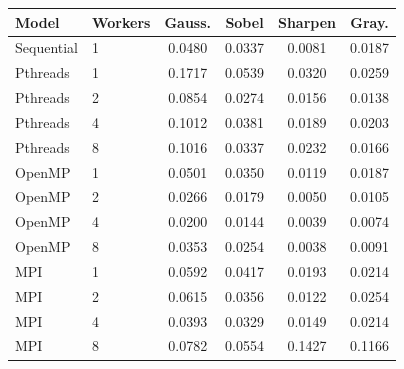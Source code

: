 \begin{tabular}{l l c c c c}
\toprule
Model & Workers & Gauss. & Sobel & Sharpen & Gray. \\
\midrule
Sequential & 1 & 0.0480 & 0.0337 & 0.0081 & 0.0187 \\
\midrule
Pthreads & 1 & 0.1717 & 0.0539 & 0.0320 & 0.0259 \\
Pthreads & 2 & 0.0854 & 0.0274 & 0.0156 & 0.0138 \\
Pthreads & 4 & 0.1012 & 0.0381 & 0.0189 & 0.0203 \\
Pthreads & 8 & 0.1016 & 0.0337 & 0.0232 & 0.0166 \\
\midrule
OpenMP & 1 & 0.0501 & 0.0350 & 0.0119 & 0.0187 \\
OpenMP & 2 & 0.0266 & 0.0179 & 0.0050 & 0.0105 \\
OpenMP & 4 & 0.0200 & 0.0144 & 0.0039 & 0.0074 \\
OpenMP & 8 & 0.0353 & 0.0254 & 0.0038 & 0.0091 \\
\midrule
MPI & 1 & 0.0592 & 0.0417 & 0.0193 & 0.0214 \\
MPI & 2 & 0.0615 & 0.0356 & 0.0122 & 0.0254 \\
MPI & 4 & 0.0393 & 0.0329 & 0.0149 & 0.0214 \\
MPI & 8 & 0.0782 & 0.0554 & 0.1427 & 0.1166 \\
\bottomrule
\end{tabular}
